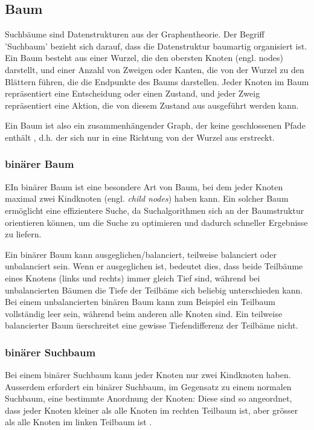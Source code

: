 \documentclass[a4paper,11pt]{article}
\begin{document}
\subsection{Baum}
Suchbäume sind Datenstrukturen aus der Graphentheorie. Der Begriff 'Suchbaum' bezieht sich darauf, dass die Datenstruktur baumartig organisiert ist. Ein Baum besteht aus einer Wurzel, die den obersten Knoten (engl. nodes) darstellt, und einer Anzahl von Zweigen oder Kanten, die von der Wurzel zu den Blättern führen, die die Endpunkte des Baums darstellen. Jeder Knoten im Baum repräsentiert eine Entscheidung oder einen Zustand, und jeder Zweig repräsentiert eine Aktion, die von diesem Zustand aus ausgeführt werden kann.


Ein Baum ist also ein zusammenhängender Graph, der keine geschlossenen Pfade enthält \cite{graphs}, d.h. der sich nur in eine Richtung von der Wurzel aus erstreckt.

\subsubsection{binärer Baum}

EIn binärer Baum ist eine besondere Art von Baum, bei dem jeder Knoten maximal zwei Kindknoten (engl. \emph{child nodes}) haben kann. Ein solcher Baum ermöglicht eine effizientere Suche, da Suchalgorithmen sich an der Baumstruktur orientieren können, um die Suche zu optimieren und dadurch schneller Ergebnisse zu liefern. 

Ein binärer Baum kann ausgeglichen/balanciert, teilweise balanciert oder unbalanciert sein. Wenn er ausgeglichen ist, bedeutet dies, dass beide Teilbäume eines Knotens (links und rechts) immer gleich Tief sind, während bei unbalancierten Bäumen die Tiefe der Teilbäme sich beliebig unterschieden kann. Bei einem unbalancierten binären Baum kann zum Beispiel ein Teilbaum vollständig leer sein, während beim anderen alle Knoten sind. Ein teilweise balancierter Baum üerschreitet eine gewisse Tiefendifferenz der Teilbäme nicht.

\subsubsection{binärer Suchbaum}
Bei einem binärer Suchbaum kann jeder Knoten nur zwei Kindknoten haben. Ausserdem erfordert ein binärer Suchbaum, im Gegensatz zu einem normalen Suchbaum, eine bestimmte Anordnung der Knoten: Diese sind so angeordnet, dass jeder Knoten kleiner als alle Knoten im rechten Teilbaum ist, aber grösser als alle Knoten im linken Teilbaum ist \cite{c2_algorithms}.
\end{document}
